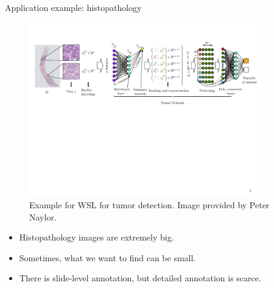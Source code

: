 \documentclass[xcolor=pdftex,dvipsnames,table]{beamer}
\begin{document}
\begin{frame}{Application example: histopathology}
\begin{figure}[htb]
   \centering
   \includegraphics[width=0.9\textwidth]{../graphics/wsl_histo.pdf}
   \caption{Example for WSL for tumor detection. Image provided by Peter Naylor.}
\end{figure}
\begin{itemize}
\item Histopathology images are extremely big.
\item Sometimes, what we want to find can be small.
\item There is slide-level annotation, but detailed annotation is scarce.
\end{itemize}
\end{frame}
\end{document}
